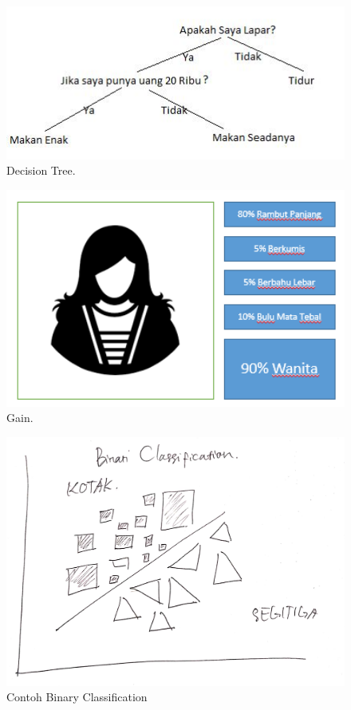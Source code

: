 \begin{figure}[ht]
		\centerline{\includegraphics[width=1\textwidth]{figures/huda/DecisionTree.JPG}}
		\caption{Decision Tree.}
		\label{7}
\end{figure}
\begin{figure}[ht]
		\centerline{\includegraphics[width=1\textwidth]{figures/huda/Gain.PNG}}
		\caption{Gain.}
		\label{8}
\end{figure}

\begin{figure}[ht]
      \centerline{\includegraphics[width=1\textwidth]
      {figures/c10}}
      \caption{Contoh Binary Classification}
      \label{c10}
      \end{figure}

